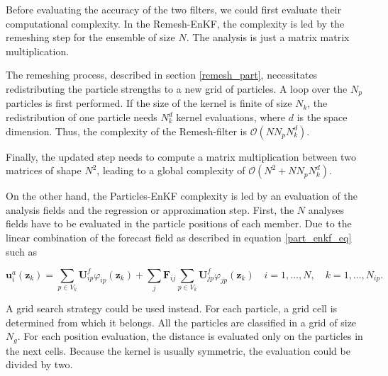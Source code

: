 Before evaluating the accuracy of the two filters, we could first evaluate their computational complexity. In the Remesh-EnKF, the complexity is led by the remeshing step for the ensemble of size $N$. The analysis is just a matrix matrix multiplication.

The remeshing process, described in section \ref{remesh_part}, necessitates redistributing the particle strengths to a new grid of particles. A loop over the $N_p$ particles is first performed. If the size of the kernel is finite of size $N_k$, the redistribution of one particle needs $N_k^d$ kernel evaluations, where $d$ is the space dimension. Thus, the complexity of the Remesh-filter is $\mathcal{O} (NN_pN_k^d)$.

Finally, the updated step needs to compute a matrix multiplication between two matrices of shape $N^2$, leading to a global complexity of $\mathcal{O} (N^2 + NN_pN_k^d)$.

On the other hand, the Particles-EnKF complexity is led by an evaluation of the analysis fields and the regression or approximation step. First, the $N$ analyses fields have to be evaluated in the particle positions of each member. Due to the linear combination of the forecast field as described in equation \ref{part_enkf_eq} such as


\begin{equation*}
  \bm u^a_i(\bm z_k) = \sum_{p \in V_k} \bm U^f_{ip} \varphi_{ip}(\bm z_k) + \sum_{j} \bm F_{ij} \sum_{p \in V_k} \bm U^f_{jp} \varphi_{jp}(\bm z_k) \quad i = 1,\dots, N, \quad k = 1, \dots, N_{ip}.
\end{equation*}




A grid search strategy could be used instead. For each particle, a grid cell is determined from which it belongs. All the particles are classified in a grid of size $N_g$. For each position evaluation, the distance is evaluated only on the particles in the next cells. Because the kernel is usually symmetric, the evaluation could be divided by two.

